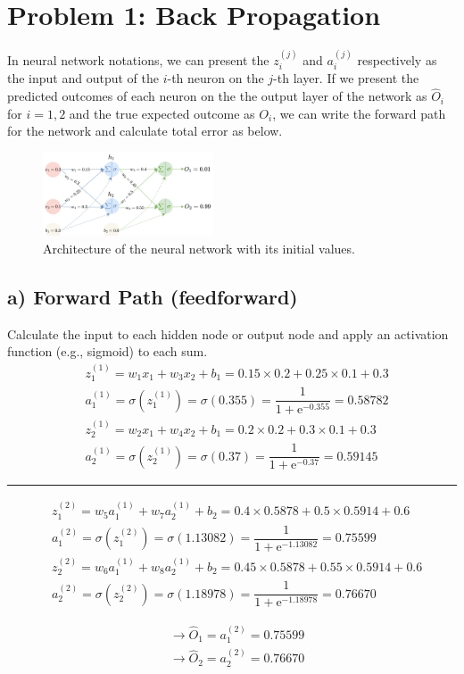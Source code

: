 \documentclass[conference]{IEEEtran}
\begin{document}
\section{Problem 1: Back Propagation}
In neural network notations, we can present the $z_i^{(j)}$ and $a_i^{(j)}$ respectively as the input and output of the $i$-th neuron on the $j$-th layer. If we present the predicted outcomes of each neuron on the the output layer of the network as $\hat{O}_i$ for $i=1, 2$ and the true expected outcome as $O_i$, we can write the forward path for the network and calculate total error as below.
\begin{figure}[htbp]
    \centerline{\includegraphics[width=0.45\textwidth]{figures/prob1.jpeg}}
    \caption{Architecture of the neural network with its initial values.}
    \label{fig:prob1}
\end{figure}
\vspace{4px}

\subsection*{a) Forward Path (feedforward)}
Calculate the input to each hidden node or output node and apply an activation function (e.g., sigmoid) to each sum.
\begin{align*}
     & z_1^{(1)} = w_1 x_1 + w_3 x_2 + b_1 = 0.15 \times 0.2 + 0.25 \times 0.1 + 0.3              \\
     & a_1^{(1)} = \sigma(z_1^{(1)}) = \sigma(0.355) = \dfrac{1}{1+\mathrm{e}^{-0.355}} = 0.58782 \\
     & z_2^{(1)} = w_2 x_1 + w_4 x_2 + b_1 = 0.2 \times 0.2 + 0.3 \times 0.1 + 0.3                \\
     & a_2^{(1)} = \sigma(z_2^{(1)}) = \sigma(0.37) = \dfrac{1}{1+\mathrm{e}^{-0.37}} = 0.59145
\end{align*}
\hrule
\begin{small}
    \begin{align*}
         & z_1^{(2)} = w_5 a_1^{(1)} + w_7 a_2^{(1)} + b_2 = 0.4 \times 0.5878 + 0.5 \times 0.5914 + 0.6   \\
         & a_1^{(2)} = \sigma(z_1^{(2)}) = \sigma(1.13082) = \dfrac{1}{1+\mathrm{e}^{-1.13082}} = 0.75599  \\
         & z_2^{(2)} = w_6 a_1^{(1)} + w_8 a_2^{(1)} + b_2 = 0.45 \times 0.5878 + 0.55 \times 0.5914 + 0.6 \\
         & a_2^{(2)} = \sigma(z_2^{(2)}) = \sigma(1.18978) = \dfrac{1}{1+\mathrm{e}^{-1.18978}} = 0.76670
    \end{align*}
\end{small}
\begin{align}
     & \rightarrow \hat{O}_1 = a_1^{(2)} = 0.75599 \\
     & \rightarrow \hat{O}_2 = a_2^{(2)} = 0.76670
\end{align}
\end{document}
